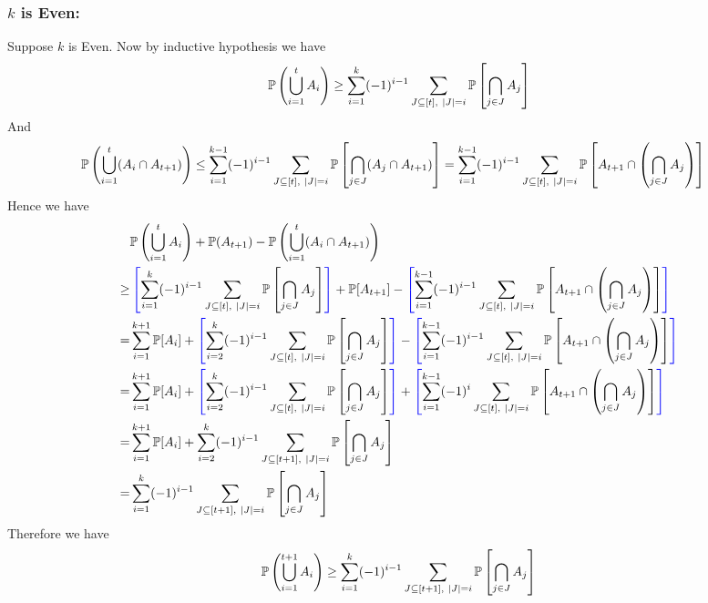 \documentclass[a4paper, 11pt]{article}
\begin{document}
{\begin{enumerate}[label=(\alph*)]
\subsubsection*{$k$ is Even:}
Suppose $k$ is Even. Now by inductive hypothesis we have $$\bbP\left(\bigcup_{i=1}^t A_i\right)
	\geq \sum\limits_{i=1}^k(-1)^{i-1}\sum\limits_{J\subseteq [t],\ |J|=i}\bbP\lt[\bigcap\limits_{j\in J}A_j\rt] $$
And \begin{align*}
	\bbP\left(\bigcup_{i=1}^t (A_i\cap A_{t+1})\right)& \leq  \sum\limits_{i=1}^{k-1}(-1)^{i-1}\sum\limits_{J\subseteq [t],\ |J|=i}\bbP\lt[ \bigcap_{j\in J}(A_j\cap A_{t+1}) \rt]= \sum_{i=1}^{k-1}(-1)^{i-1}\sum_{J\subseteq [t],\ |J|=i}\bbP\lt[ A_{t+1}\cap\lt( \bigcap_{j\in J}A_j \rt)\rt]
\end{align*}
Hence we have \begin{align*}
	&\bbP\left(\bigcup_{i=1}^t A_i\right)+\bbP(A_{t+1})-\bbP\left(\bigcup_{i=1}^t (A_i\cap A_{t+1})\right)\\
	\geq &  \mathcolor{blue}{\left[}\sum\limits_{i=1}^k(-1)^{i-1}\sum\limits_{J\subseteq [t],\ |J|=i}\bbP\lt[\bigcap\limits_{j\in J}A_j\rt]\mathcolor{blue}{\right]}+\bbP[A_{t+1}]-\mathcolor{blue}{\left[}\sum_{i=1}^{k-1}(-1)^{i-1}\sum_{J\subseteq [t],\ |J|=i}\bbP\lt[ A_{t+1}\cap\lt( \bigcap_{j\in J}A_j \rt)\rt]\mathcolor{blue}{\right]}\\
	= & \sum_{i=1}^{k+1}\bbP[A_i]+ \mathcolor{blue}{\left[}\sum\limits_{i=2}^k(-1)^{i-1}\sum\limits_{J\subseteq [t],\ |J|=i}\bbP\lt[\bigcap\limits_{j\in J}A_j\rt]\mathcolor{blue}{\right]}-\mathcolor{blue}{\left[}\sum_{i=1}^{k-1}(-1)^{i-1}\sum_{J\subseteq [t],\ |J|=i}\bbP\lt[ A_{t+1}\cap\lt( \bigcap_{j\in J}A_j \rt)\rt]\mathcolor{blue}{\right]}\\
	= & \sum_{i=1}^{k+1}\bbP[A_i]+ \mathcolor{blue}{\left[}\sum\limits_{i=2}^k(-1)^{i-1}\sum\limits_{J\subseteq [t],\ |J|=i}\bbP\lt[\bigcap\limits_{j\in J}A_j\rt]\mathcolor{blue}{\right]}+\mathcolor{blue}{\left[}\sum_{i=1}^{k-1}(-1)^{i}\sum_{J\subseteq [t],\ |J|=i}\bbP\lt[ A_{t+1}\cap\lt( \bigcap_{j\in J}A_j \rt)\rt]\mathcolor{blue}{\right]}\\
	= &  \sum_{i=1}^{k+1}\bbP[A_i]+ \sum\limits_{i=2}^k(-1)^{i-1}\sum\limits_{J\subseteq [t+1],\ |J|=i}\bbP\lt[\bigcap\limits_{j\in J}A_j\rt]\\
	= & \sum\limits_{i=1}^k(-1)^{i-1}\sum\limits_{J\subseteq [t+1],\ |J|=i}\bbP\lt[\bigcap\limits_{j\in J}A_j\rt]
\end{align*}Therefore we have $$\mathbb{P}\left(\bigcup_{i=1}^{t+1}A_i\right)\geq  \sum\limits_{i=1}^k(-1)^{i-1}\sum\limits_{J\subseteq [t+1],\ |J|=i}\mathbb{P}\left[\bigcap\limits_{j\in J}A_j\right]$$

\end{enumerate}}
\end{document}
